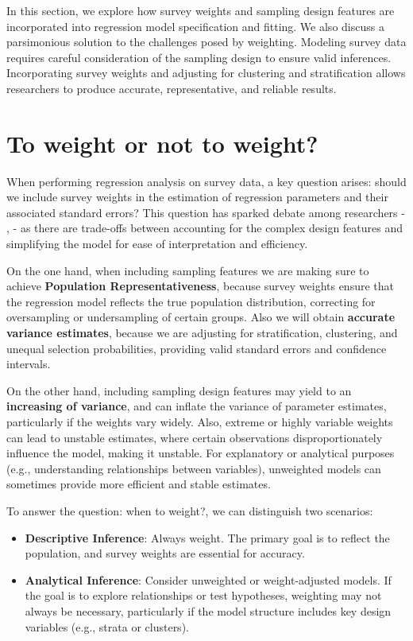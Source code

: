 \documentclass[
  12pt,
]{book}
\begin{document}
In this section, we explore how survey weights and sampling design features are incorporated into regression model specification and fitting. We also discuss a parsimonious solution to the challenges posed by weighting. Modeling survey data requires careful consideration of the sampling design to ensure valid inferences. Incorporating survey weights and adjusting for clustering and stratification allows researchers to produce accurate, representative, and reliable results.

\hypertarget{to-weight-or-not-to-weight}{%
\section{To weight or not to weight?}\label{to-weight-or-not-to-weight}}

When performing regression analysis on survey data, a key question arises: should we include survey weights in the estimation of regression parameters and their associated standard errors? This question has sparked debate among researchers - \citet{skinner1989analysis}, \citet{pfeffermann2011modelling} - as there are trade-offs between accounting for the complex design features and simplifying the model for ease of interpretation and efficiency.

On the one hand, when including sampling features we are making sure to achieve \textbf{Population Representativeness}, because survey weights ensure that the regression model reflects the true population distribution, correcting for oversampling or undersampling of certain groups. Also we will obtain \textbf{accurate variance estimates}, because we are adjusting for stratification, clustering, and unequal selection probabilities, providing valid standard errors and confidence intervals.

On the other hand, including sampling design features may yield to an \textbf{increasing of variance}, and can inflate the variance of parameter estimates, particularly if the weights vary widely. Also, extreme or highly variable weights can lead to unstable estimates, where certain observations disproportionately influence the model, making it unstable. For explanatory or analytical purposes (e.g., understanding relationships between variables), unweighted models can sometimes provide more efficient and stable estimates.

To answer the question: when to weight?, we can distinguish two scenarios:

\begin{itemize}
\item
  \textbf{Descriptive Inference}: Always weight. The primary goal is to reflect the population, and survey weights are essential for accuracy.
\item
  \textbf{Analytical Inference}: Consider unweighted or weight-adjusted models. If the goal is to explore relationships or test hypotheses, weighting may not always be necessary, particularly if the model structure includes key design variables (e.g., strata or clusters).
\end{itemize}
\end{document}
